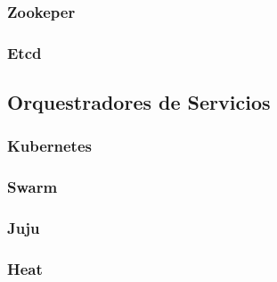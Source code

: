 	    \subsubsection{Zookeper}

	    \subsubsection{Etcd}

    \subsection{Orquestradores de Servicios}

	    \subsubsection{Kubernetes}

	    \subsubsection{Swarm}

	    \subsubsection{Juju}

	    \subsubsection{Heat}